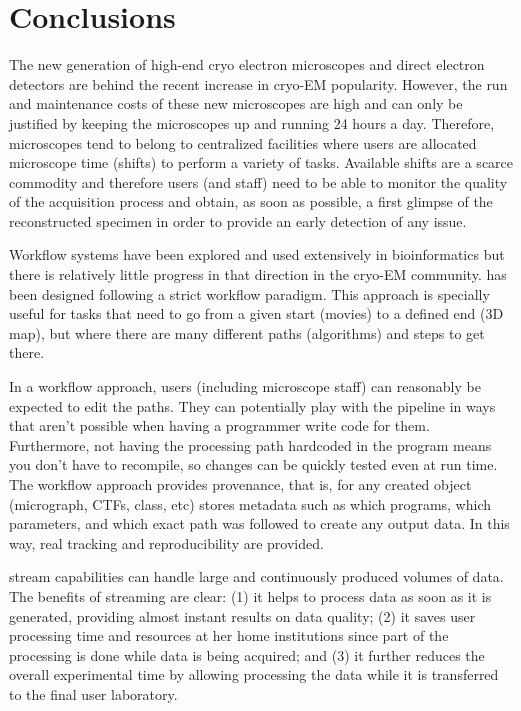 
\section{Conclusions}

The new generation of high-end cryo electron microscopes and direct electron detectors are behind the recent increase in cryo-EM  popularity. However, the run and maintenance costs of these new microscopes are high and can only be justified by keeping the microscopes up and running 24 hours a day. Therefore, microscopes tend to belong to centralized facilities where users are allocated microscope time (shifts) to perform a variety of tasks. Available shifts are a scarce commodity and therefore users (and staff) need to be able to monitor the quality of the acquisition process and obtain, as soon as possible, a first glimpse of the reconstructed specimen in order to provide an early detection of any issue. 

 Workflow systems have been explored and used extensively in bioinformatics but there is relatively little progress in that direction in the cryo-EM community. \scipion has been designed following a strict workflow paradigm. This approach is specially useful for tasks that need to go from a given start (movies) to a defined end (3D map), but where there are many different paths (algorithms) and steps to get there.
 
 In a workflow approach, users (including microscope staff) can reasonably be expected to edit the paths. They can potentially play with the pipeline in ways that aren't possible when having a programmer write code for them. Furthermore, not having the processing path hardcoded in the program means you don't have to recompile, so changes can be quickly tested   even at run time. The \scipion workflow approach provides provenance, that is,  for any created object (micrograph, CTFs, class, etc) \scipion stores metadata such as which programs, which parameters, and which exact path was followed to create any output data.  In this way,  real tracking and reproducibility are provided. 

 \scipion stream capabilities can handle large and continuously produced volumes of data. The benefits of streaming are clear: (1) it helps to process data as soon as it is generated,  providing almost instant results on data quality; (2) it saves user processing time and resources at her home institutions since part of the processing is done while data is being acquired; and (3) 
 it further reduces the overall experimental time by allowing processing the data while it is transferred to the final user laboratory. 
 
